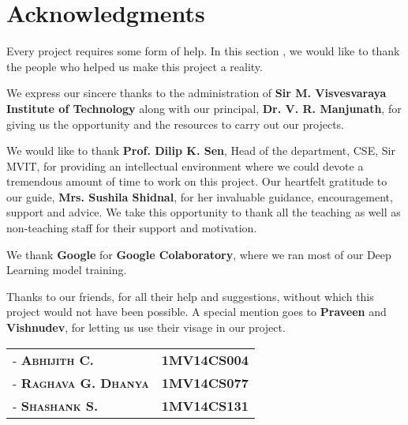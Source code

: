 \chapter*{Acknowledgments}
\noindent Every project requires some form of help. In this section , we would like to thank the people who helped us make this project a reality.
\par\bigskip
We express our sincere thanks to the administration of \textbf{Sir M. Visvesvaraya Institute of Technology} along with our principal, \textbf{Dr. V. R. Manjunath}, for giving us the opportunity and the resources to carry out our projects.
\par\bigskip
We would like to thank \textbf{Prof. Dilip K. Sen}, Head of the department, CSE, Sir MVIT, for providing an intellectual environment where we could devote a tremendous amount of time to work on this project. Our heartfelt gratitude to our guide, \textbf{Mrs. Sushila Shidnal}, for her invaluable guidance, encouragement, support and advice. We take this opportunity to thank all the teaching as well as non-teaching staff for their support and motivation. 
\par\bigskip
We thank \textbf{Google} for \textbf{Google Colaboratory}, where we ran most of our Deep Learning model training.
\par\bigskip
Thanks to our friends, for all their help and suggestions, without which this project would not have been possible. A special mention goes to \textbf{Praveen} and \textbf{Vishnudev}, for letting us use their visage in our project.
\par\bigskip
\vspace{50px}
\noindent\hfill\begin{tabular}{ l r }
        \textsc{-  \textbf{Abhijith C.}}       &  \textbf{1MV14CS004} \\
        \textsc{-  \textbf{Raghava G. Dhanya}} &  \textbf{1MV14CS077} \\
        \textsc{-  \textbf{Shashank S.}}       &  \textbf{1MV14CS131}
\end{tabular}